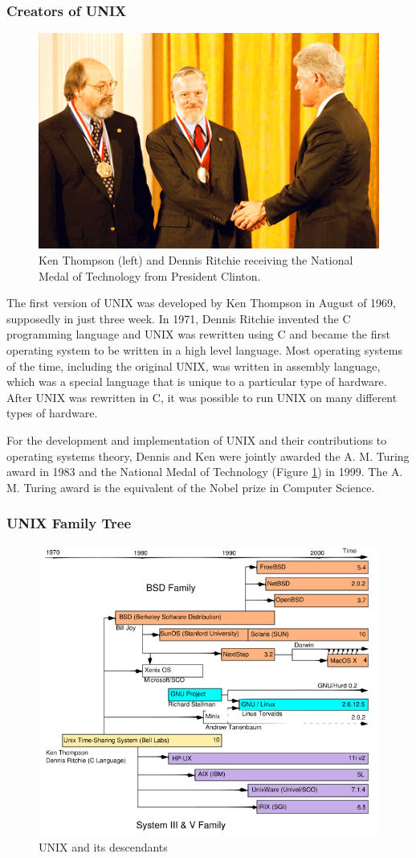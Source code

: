 \documentclass[a4paper]{beamer}
\newcommand{\ftitle}[1]{\frametitle<presentation>{#1}}
\begin{document}
\begin{frame}
\ftitle{Creators of UNIX}
\begin{figure}
\begin{center}\includegraphics[width=0.7\linewidth]{dennis-ken3}\end{center}
\caption{Ken Thompson (left) and Dennis Ritchie receiving the National Medal of
Technology from President Clinton.}
\label{fig:medal}
\end{figure}
\end{frame}

The first version of UNIX was developed by Ken Thompson in August of 1969,
supposedly in just three week. In 1971, Dennis Ritchie invented the C
programming language and UNIX was rewritten using C and became the first
operating system to be written in a high level language. Most operating systems
of the time, including the original UNIX, was written in assembly language,
which was a special language that is unique to a particular type of hardware.
After UNIX was rewritten in C, it was possible to run UNIX on many different
types of hardware.     

For the development and implementation of UNIX and their contributions to
operating systems theory, Dennis and Ken were jointly awarded the A. M. Turing
award in 1983 and the National Medal of Technology (Figure \ref{fig:medal}) in
1999. The A. M. Turing award is the equivalent of the Nobel prize in Computer
Science.  

\begin{frame}
\ftitle{UNIX Family Tree}
\begin{figure}
\begin{center}\includegraphics[width=0.7\linewidth]{unix_timeline}\end{center}
\caption{UNIX and its descendants}
\label{fig:timeline}
\end{figure}
\end{frame}
\end{document}
